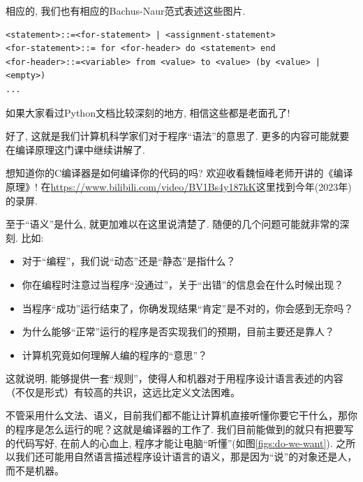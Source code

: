 相应的, 我们也有相应的Bachus-Naur范式表述这些图片. 

\begin{lstlisting}
<statement>::=<for-statement> | <assignment-statement>
<for-statement>::= for <for-header> do <statement> end
<for-header>::=<variable> from <value> to <value> (by <value> | <empty>)
...
\end{lstlisting}

如果大家看过Python文档比较深刻的地方, 相信这些都是老面孔了! 

好了, 这就是我们计算机科学家们对于程序``语法''的意思了. 更多的内容可能就要在编译原理这门课中继续讲解了. 

\begin{bonus}
	想知道你的C编译器是如何编译你的代码的吗? 欢迎收看魏恒峰老师开讲的《编译原理》! 在\url{https://www.bilibili.com/video/BV1Bs4y187kK}这里找到今年(2023年)的录屏. 
\end{bonus}

至于``语义''是什么, 就更加难以在这里说清楚了. 随便的几个问题可能就非常的深刻. 比如: 

\begin{itemize}
	\item 对于“编程”，我们说“动态”还是“静态”是指什么？
	\item 你在编程时注意过当程序“没通过”，关于“出错”的信息会在什么时候出现？
	\item 当程序“成功”运行结束了，你确发现结果“肯定”是不对的，你会感到无奈吗？
	\item 为什么能够“正常”运行的程序是否实现我们的预期，目前主要还是靠人？
	\item 计算机究竟如何理解人编的程序的“意思”？
\end{itemize}

这就说明, 能够提供一套“规则”，使得人和机器对于用程序设计语言表述的内容（不仅是形式）有较高的共识，这远比定义文法困难。

不管采用什么文法、语义，目前我们都不能让计算机直接听懂你要它干什么，那你的程序是怎么运行的呢？这就是编译器的工作了. 我们目前能做到的就只有把要写的代码写好, 在前人的心血上, 程序才能让电脑``听懂''(如图\ref{figs:do-we-want}). 之所以我们还可能用自然语言描述程序设计语言的语义，那是因为“说”的对象还是人，而不是机器。

